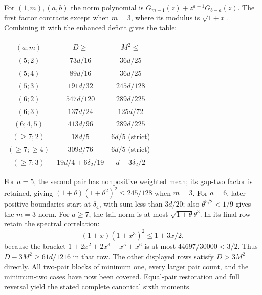 For $(1,m),(a,b)$ the norm polynomial is
$G_{m-1}(z)+z^{a-1}G_{b-a}(z)$.
The first factor contracts except when $m=3$, where its modulus is
$\sqrt{1+x}$. Combining it with the enhanced deficit gives the table:
\begin{center}\small
\begin{tabular}{@{}ccc@{}}\toprule
$(a;m)$&$D\ge$&$M^2\le$\\\midrule
$(5;2)$&$73d/16$&$36d/25$\\
$(5;4)$&$89d/16$&$36d/25$\\
$(5;3)$&$191d/32$&$245d/128$\\
$(6;2)$&$547d/120$&$289d/225$\\
$(6;3)$&$137d/24$&$125d/72$\\
$(6;4,5)$&$413d/96$&$289d/225$\\
$(\ge7;2)$&$18d/5$&$6d/5$ (strict)\\
$(\ge7;\ge4)$&$309d/76$&$6d/5$ (strict)\\
$(\ge7;3)$&$19d/4+6\delta_{2}/19$&$d+3\delta_{2}/2$\\\bottomrule
\end{tabular}
\end{center}
For $a=5$, the second pair has nonpositive weighted mean; its gap-two
factor is retained, giving $(1+\theta)(1+\theta^2)^2\le245/128$ when $m=3$.
For $a=6$, later positive boundaries start at $\delta_{4}$, with sum less than
$3d/20$; also $\theta^{5/2}<1/9$ gives the $m=3$ norm.
For $a\ge7$, the tail norm is at most $\sqrt{1+\theta}\theta^3$.
In its final row retain the spectral correlation:
\[
 (1+x)(1+x^3)^2\le1+3x/2,
\]
because the bracket $1+2x^2+2x^3+x^5+x^6$ is at most
$44697/30000<3/2$. Thus $D-3M^2\ge61d/1216$ in that row.
The other displayed rows satisfy $D>3M^2$ directly.
All two-pair blocks of minimum one, every larger pair count, and the
minimum-two cases have now been covered. Equal-pair restoration and full
reversal yield the stated complete canonical sixth moments.
